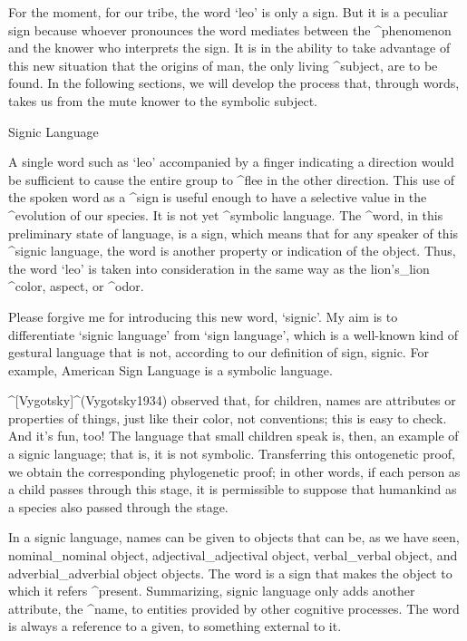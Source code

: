 For the moment, for our tribe, the word `leo' is only a sign. But it is
a peculiar sign because whoever pronounces the word mediates between the
^{phenomenon} and the knower who interprets the sign. It is in the
ability to take advantage of this new situation that the origins of man,
the only living ^{subject}, are to be found. In the following sections,
we will develop the process that, through words, takes us from the mute
knower to the symbolic subject.


\Section Signic Language

A single word such as `leo' accompanied by a finger indicating a
direction would be sufficient to cause the entire group to ^{flee} in
the other direction. This use of the spoken word as a ^{sign} is useful
enough to have a selective value in the ^{evolution} of our species. It
is not yet ^{symbolic language}. The ^{word}, in this preliminary state
of language, is a sign, which means that for any speaker of this
^{signic language}, the word is another property or indication of the
object. Thus, the word `leo' is taken into consideration in the same way
as the lion's_{lion} ^{color}, aspect, or ^{odor}.

\beginpoints
Please forgive me for introducing this new word, `signic'. My aim is to
differentiate `signic language' from `sign language', which is a
well-known kind of gestural language that is not, according to our
definition of sign, signic. For example, American Sign Language is a
symbolic language.
\endpoints

^[Vygotsky]^(Vygotsky1934) observed that, for children, names are
attributes or properties of things, just like their color, not
conventions; this is easy to check. And it's fun, too!  The language
that small children speak is, then, an example of a signic language;
that is, it is not symbolic. Transferring this ontogenetic proof, we
obtain the corresponding phylogenetic proof; in other words, if each
person as a child passes through this stage, it is permissible to
suppose that humankind as a species also passed through the stage.

In a signic language, names can be given to objects that can be, as we
have seen, nominal_{nominal object}, adjectival_{adjectival object},
verbal_{verbal object}, and adverbial_{adverbial object} objects. The
word is a sign that makes the object to which it refers ^{present}.
Summarizing, signic language only adds another attribute, the ^{name},
to entities provided by other cognitive processes. The word is always a
reference to a given, to something external to it.


